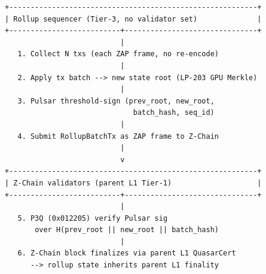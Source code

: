 \begin{verbatim}
+----------------------------------------------------------+
| Rollup sequencer (Tier-3, no validator set)              |
+--------------------------+-------------------------------+
                           |
   1. Collect N txs (each ZAP frame, no re-encode)
                           |
   2. Apply tx batch --> new state root (LP-203 GPU Merkle)
                           |
   3. Pulsar threshold-sign (prev_root, new_root,
                              batch_hash, seq_id)
                           |
   4. Submit RollupBatchTx as ZAP frame to Z-Chain
                           |
                           v
+----------------------------------------------------------+
| Z-Chain validators (parent L1 Tier-1)                    |
+--------------------------+-------------------------------+
                           |
   5. P3Q (0x012205) verify Pulsar sig
       over H(prev_root || new_root || batch_hash)
                           |
   6. Z-Chain block finalizes via parent L1 QuasarCert
      --> rollup state inherits parent L1 finality
\end{verbatim}
